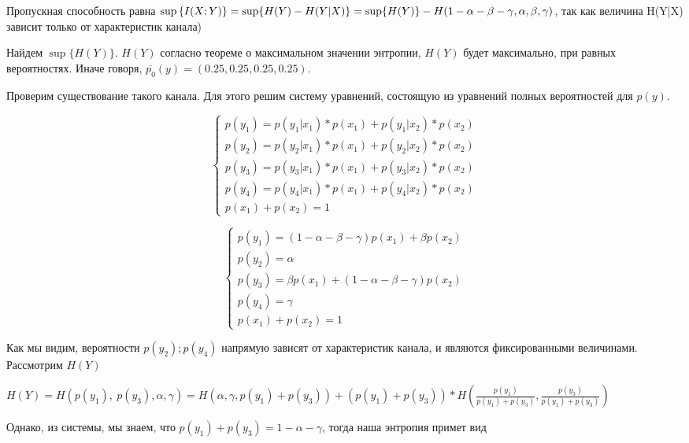\documentclass[../main.tex]{subfiles}
\begin{document}
Пропускная способность равна $\sup{\{I(X;Y)\}} = \sup\{H(Y)-H(Y|X)\} =\sup\{H(Y)\} - \newline H(1-\alpha-\beta - \gamma, \alpha, \beta, \gamma)$, так как величина H(Y|X) зависит только от характеристик канала)

Найдем $\sup\{H(Y)\}$. $H(Y)$ согласно теореме о максимальном значении энтропии, $H(Y)$ будет максимально, при равных вероятностях. Иначе говоря, $\overline{p_{0}}(y)=(0.25,0.25,0.25,0.25)$. 

Проверим существование такого канала. Для этого решим систему уравнений, состоящую из уравнений полных вероятностей для $p(y)$. 

\begin{center}
    \begin{equation}
    \left\{
    \begin{array}{ll}
    p(y_1)  = p(y_1|x_1)*p(x_1) + p(y_1|x_2)*p(x_2)\\
    p(y_2)  = p(y_2|x_1)*p(x_1) + p(y_2|x_2)*p(x_2)\\
    p(y_3)  = p(y_3|x_1)*p(x_1) + p(y_3|x_2)*p(x_2)\\
    p(y_4)  = p(y_4|x_1)*p(x_1) + p(y_4|x_2)*p(x_2)\\
    p(x_1) + p(x_2) =1
    \end{array}
    \right.
\end{equation}

\begin{equation}
    \left\{
    \begin{array}{ll}
    p(y_1)  = (1-\alpha-\beta - \gamma)p(x_1) + \beta p(x_2)\\
    p(y_2)  = \alpha\\
    p(y_3)  = \beta p(x_1) + (1-\alpha-\beta - \gamma)p(x_2)\\
    p(y_4)  = \gamma\\
    p(x_1) + p(x_2) =1
    \end{array}
    \right.
\end{equation}
\end{center}


Как мы видим, вероятности $p(y_2); p(y_4)$ напрямую зависят от характеристик канала, и являются фиксированными величинами. Рассмотрим $H(Y)$

$H(Y) = H(p(y_1),\ p(y_3),\alpha, \gamma) = H(\alpha, \gamma, p(y_1) + p(y_3)) + (p(y_1) + p(y_3))*H(\frac{p(y_1)}{p(y_1) + p(y_3)}, \frac{p(y_3)}{p(y_1) + p(y_3)})$

Однако, из системы, мы знаем, что $p(y_1) + p(y_3) = 1-\alpha-\gamma$, тогда наша энтропия примет вид
\end{document}
